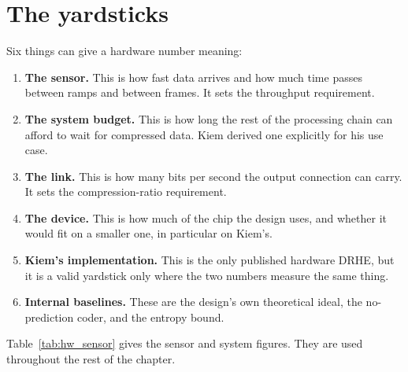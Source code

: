 \section{The yardsticks}
\label{sec:hw_yardsticks}

Six things can give a hardware number meaning:

\begin{enumerate}
\item \textbf{The sensor.} This is how fast data arrives and how much time
passes between ramps and between frames. It sets the throughput requirement.
\item \textbf{The system budget.} This is how long the rest of the processing
chain can afford to wait for compressed data. Kiem derived one explicitly for
his use case.
\item \textbf{The link.} This is how many bits per second the output
connection can carry. It sets the compression-ratio requirement.
\item \textbf{The device.} This is how much of the chip the design uses, and
whether it would fit on a smaller one, in particular on Kiem's.
\item \textbf{Kiem's implementation.} This is the only published hardware
DRHE, but it is a valid yardstick only where the two numbers measure the same
thing.
\item \textbf{Internal baselines.} These are the design's own theoretical
ideal, the no-prediction coder, and the entropy bound.
\end{enumerate}

\noindent
Table~\ref{tab:hw_sensor} gives the sensor and system figures. They are used
throughout the rest of the chapter.

